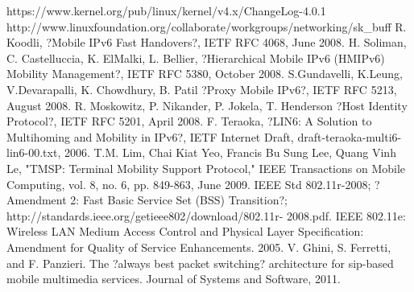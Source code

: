\begin{thebibliography}{90}   
\rhead[\fancyplain{}{\bfseries \leftmark}]{\fancyplain{}{\bfseries
\thepage}}
 https://www.kernel.org/pub/linux/kernel/v4.x/ChangeLog-4.0.1
 http://www.linuxfoundation.org/collaborate/workgroups/networking/sk\_buff
 R. Koodli, ?Mobile IPv6 Fast Handovers?, IETF RFC 4068, June 2008.
  H. Soliman, C. Castelluccia, K. ElMalki, L. Bellier, ?Hierarchical Mobile IPv6 (HMIPv6) Mobility Management?, IETF RFC 5380, October 2008.
 S.Gundavelli, K.Leung, V.Devarapalli, K. Chowdhury, B. Patil ?Proxy Mobile IPv6?, IETF RFC 5213, August 2008.
 R. Moskowitz, P. Nikander, P. Jokela, T. Henderson ?Host Identity Protocol?, IETF RFC 5201, April 2008. 
 F. Teraoka, ?LIN6: A Solution to Multihoming and Mobility in IPv6?, IETF Internet Draft, draft-teraoka-multi6-lin6-00.txt, 2006.
	T.M. Lim, Chai Kiat Yeo, Francis Bu Sung Lee, Quang Vinh Le, "TMSP: Terminal Mobility Support Protocol," IEEE Transactions on Mobile Computing, vol. 8, no. 6, pp. 849-863, June 2009.
 IEEE Std 802.11r-2008; ?Amendment 2: Fast Basic Service Set (BSS) Transition?; http://standards.ieee.org/getieee802/download/802.11r- 2008.pdf.
 IEEE 802.11e: Wireless LAN Medium Access Control and Physical Layer Specification: Amendment for Quality of Service Enhancements. 2005.
 V. Ghini, S. Ferretti, and F. Panzieri. The ?always best packet switching? architecture for sip-based mobile multimedia services. Journal of Systems and Software, 2011.
\end{thebibliography}
